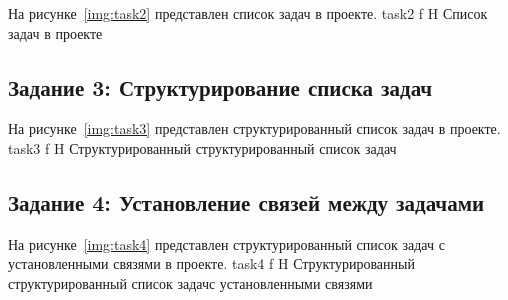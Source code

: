 На рисунке~\ref{img:task2} представлен список задач в проекте.
	{task2}
	{f}
	{H}
	{\textwidth}
	{Список задач в проекте}

\clearpage
\subsection{Задание 3: Структурирование списка задач}

На рисунке~\ref{img:task3} представлен структурированный список задач в проекте.
	{task3}
	{f}
	{H}
	{\textwidth}
	{Структурированный структурированный список задач}

\subsection{Задание 4: Установление связей между задачами}

На рисунке~\ref{img:task4} представлен структурированный список задач с установленными связями в проекте.
	{task4}
	{f}
	{H}
	{\textwidth}
	{Структурированный структурированный список задачс установленными связями}
